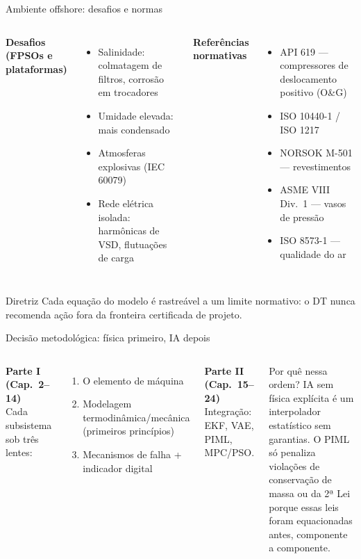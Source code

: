 \documentclass[aspectratio=169,12pt]{beamer}
\begin{document}
\begin{frame}{Ambiente offshore: desafios e normas}
	\begin{columns}[T]
		\textbf{Desafios (FPSOs e plataformas)}
		\begin{itemize}
			\item Salinidade: colmatagem de filtros, corrosão em trocadores
			\item Umidade elevada: mais condensado
			\item Atmosferas explosivas (IEC 60079)
			\item Rede elétrica isolada: harmônicas de VSD, flutuações de carga
		\end{itemize}
		\textbf{Referências normativas}
		\begin{itemize}
			\item API 619 — compressores de deslocamento positivo (O\&G)
			\item ISO 10440-1 / ISO 1217
			\item NORSOK M-501 — revestimentos
			\item ASME VIII Div.\ 1 — vasos de pressão
			\item ISO 8573-1 — qualidade do ar
		\end{itemize}
	\end{columns}
	\vfill
	\begin{alertblock}{Diretriz}
		Cada equação do modelo é rastreável a um limite normativo: o DT nunca recomenda ação fora da fronteira certificada de projeto.
	\end{alertblock}
\end{frame}

\begin{frame}{Decisão metodológica: física primeiro, IA depois}
	\begin{columns}[T]
		\textbf{Parte I (Cap.\ 2--14)}\\
		Cada subsistema sob três lentes:
		\begin{enumerate}
			\item O elemento de máquina
			\item Modelagem termodinâmica/mecânica (primeiros princípios)
			\item Mecanismos de falha + indicador digital
		\end{enumerate}
		\textbf{Parte II (Cap.\ 15--24)}\\
		Integração: EKF, VAE, PIML, MPC/PSO.
		\vspace{0.5em}
		\begin{block}{Por quê nessa ordem?}
			IA sem física explícita é um interpolador estatístico sem garantias. O PIML só penaliza violações de conservação de massa ou da 2ª Lei porque essas leis foram equacionadas antes, componente a componente.
		\end{block}
	\end{columns}
\end{frame}
\end{document}
